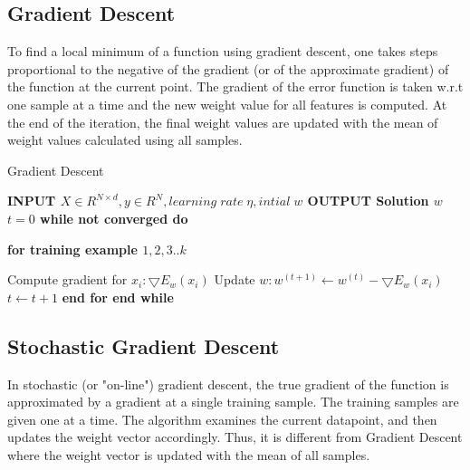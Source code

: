 \documentclass{sigplanconf}
\newlength\myindent
\newcommand\bindent{
  \begingroup
  \setlength{\itemindent}{\myindent}
  \addtolength{\algorithmicindent}{\myindent}
}
\newcommand\eindent{\endgroup}
\newlength\mysecindent
\newcommand\quadindent{
  \begingroup
  \setlength{\itemindent}{\mysecindent}
  \addtolength{\algorithmicindent}{\mysecindent}
}
\newcommand\quadeindent{\endgroup}
\begin{document}
\subsection{Gradient Descent}
To find a local minimum of a function using gradient descent, one takes steps proportional to the negative of 
the gradient (or of the approximate gradient) of the function at the current point. The gradient of the error 
function is taken w.r.t one sample at a time and the new weight value for all features is computed.
At the end of the iteration, the final weight values are updated with the mean of weight values calculated using all samples.

\begin{algorithm}
\caption{	Gradient Descent}
\begin{algorithmic} 

\STATE \bf{INPUT} \begin{math} X \in {R}^{N \times  d}, y \in R^N, learning\;  rate\;  \eta, intial\; w \end{math} 
\STATE \bf{OUTPUT} \textnormal{Solution} \begin{math}  w \end{math} 
	\STATE \textnormal{\begin{math} t = 0\end{math} }
	\STATE \bf{while} \textnormal{not converged} \bf{do}
    	\bindent
		 \STATE \bf{for} \textnormal{\indent training example \begin{math}1,2,3..k\end{math}}
		\quadindent
			 \STATE \textnormal{\indent Compute gradient for \begin{math}x_i: \bigtriangledown{E_w(x_i)}\end{math}}
			 \STATE \textnormal{\indent Update \begin{math}w: w^{(t+1)} \gets w^{(t)} - \bigtriangledown{E_w(x_i)}\end{math}}
			 \STATE \textnormal{\indent \begin{math}t \gets t + 1\end{math}}
		\quadeindent
	 \STATE \bf{end for}
	 \eindent
\STATE \bf{end while}

\end{algorithmic}
\end{algorithm}



\subsection{Stochastic Gradient Descent}
In stochastic (or "on-line") gradient descent, the true gradient of the function is approximated by a gradient at a
single training sample. The training samples are given one at a time. The algorithm examines the
current datapoint, and then updates the weight vector accordingly. Thus, it is different from Gradient Descent where the weight
vector is updated with the mean of all samples.
\end{document}
